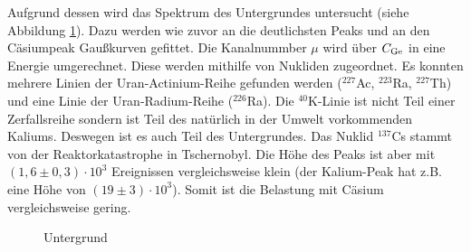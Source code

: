 Aufgrund dessen wird das Spektrum des Untergrundes untersucht (siehe Abbildung \ref{fig:unter}). Dazu werden wie zuvor an die deutlichsten Peaks und an den Cäsiumpeak Gaußkurven gefittet. Die Kanalnummber $\mu$ wird über $C_\mathrm{Ge}$ in eine Energie umgerechnet. Diese werden mithilfe von \cite{lara} Nukliden zugeordnet. Es konnten mehrere Linien der Uran-Actinium-Reihe gefunden werden ($^{227}$Ac, $^{223}$Ra, $^{227}$Th) und eine Linie der Uran-Radium-Reihe ($^{226}$Ra). Die $^{40}$K-Linie ist nicht Teil einer Zerfallsreihe sondern ist Teil des natürlich in der Umwelt vorkommenden Kaliums. Deswegen ist es auch Teil des Untergrundes. Das Nuklid $^{137}$Cs stammt von der Reaktorkatastrophe in Tschernobyl. Die Höhe des Peaks ist aber mit $(1,6 \pm 0,3) \cdot 10^3$ Ereignissen vergleichsweise klein (der Kalium-Peak hat z.B. eine Höhe von $(19 \pm 3)\cdot 10^3$). Somit ist die Belastung mit Cäsium vergleichsweise gering.

\begin{figure}[!h]
\centering
{}
\caption{Untergrund}
\label{fig:unter}
\end{figure}

